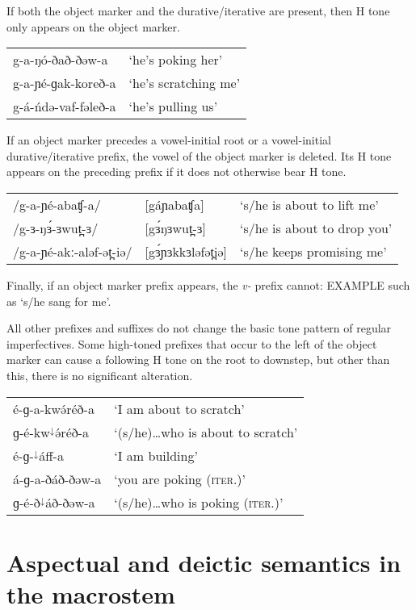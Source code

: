 If both the object marker and the durative/iterative are present, then H tone only appears on the object marker.

\ea 
\begin{tabular}[t]{ll}
g-a-ŋó-ðað-ðəw-a	&	‘he’s poking her’\\
g-a-ɲé-ɡak-koreð-a	&	‘he’s scratching me’\\
g-á-ńdə-vaf-fəleð-a	&	‘he’s pulling us’\\ 	
\end{tabular}
\z 

If an object marker precedes a vowel-initial root or a vowel-initial durative/iterative prefix, the vowel of the object marker is deleted. Its H tone appears on the preceding prefix if it does not otherwise bear H tone.  

\ea 
\begin{tabular}[t]{lll}
/g-a-ɲé-abaʧ-a/	&	[gáɲabaʧa]	&	‘s/he is about to lift me’ \\
/g-ɜ-ŋɜ́-ɜwut̪-ɜ/	&	[gɜ́ŋɜwut̪-ɜ]	&	‘s/he is about to drop you’\\
/g-a-ɲé-akː-aləf-ət̪-iə/	&	[gɜ́ɲɜkkɜləfət̪iə]	&	‘s/he keeps promising me’\\ 	
\end{tabular}
\z 

Finally, if an object marker prefix appears, the \textit{v-} prefix cannot: EXAMPLE such as ‘s/he sang for me’. %

All other prefixes and suffixes do not change the basic tone pattern of regular imperfectives. Some high-toned prefixes that occur to the left of the object marker can cause a following H tone on the root to downstep, but other than this, there is no significant alteration.
\ea 
\begin{tabular}[t]{ll}
é-ɡ-a-kwə́réð-a	&	‘I am about to scratch’\\
ɡ-é-kw$^{\downarrow}$ə́réð-a		&	‘(s/he)…who is about to scratch’\\
é-ɡ-$^{\downarrow}$áff-a		&	‘I am building’\\
á-ɡ-a-ðáð-ðəw-a	&	‘you are poking (\textsc{iter}.)’\\
ɡ-é-ð$^{\downarrow}$áð-ðəw-a	&	‘(s/he)…who is poking (\textsc{iter}.)’\\ 
\end{tabular}
\z 


\section{Aspectual and deictic semantics in the macrostem}\label{sec:ch11:macrostemsem}


